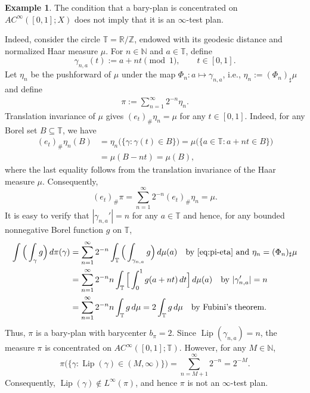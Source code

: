 \documentclass[11pt]{amsart}
\theoremstyle{definition}
\newtheorem{example}[theorem]{Example}
\theoremstyle{remark}
\numberwithin{equation}{section}
\begin{document}
\begin{example}\label{ex-plans}
The condition that a bary-plan is concentrated on
$AC^{\infty}([0,1];X)$ does not imply that it is an
$\infty$-test plan.

Indeed, consider the circle $\mathbb T=\mathbb R/\mathbb Z$, endowed
with its geodesic distance and normalized Haar measure $\mu$. For
$n\in\mathbb N$ and $a\in\mathbb T$, define
$$
    \gamma_{n,a}(t):=a+nt\pmod 1,
    \qquad t\in[0,1].
$$
Let $\eta_n$ be the pushforward of $\mu$ under the map
$\Phi_n:a\mapsto\gamma_{n,a}$, i.e., $\eta_n:= (\Phi_n)_\sharp\mu
$ and define
\begin{align}\label{eq:pi-eta}
\pi:=\sum_{n=1}^{\infty}2^{-n}\eta_n.
\end{align}
Translation invariance of $\mu$ gives
$(e_t)_\#\eta_n=\mu$ for any $t\in[0,1]$.
Indeed, for any Borel set $B\subseteq\mathbb T$, we have
\begin{align*}
(e_t)_\#\eta_n(B)
&=\eta_n\bigl(\{\gamma:\gamma(t)\in B\}\bigr)=\mu\bigl(\{a\in\mathbb T:a+nt\in B\}\bigr) \\
&=\mu(B-nt)=\mu(B),
\end{align*}
where the last equality follows from the translation invariance of the
Haar measure $\mu$. Consequently,
$$
(e_t)_\#\pi=\sum_{n=1}^{\infty}2^{-n}(e_t)_\#\eta_n =\mu.
$$
It is easy to verify that $|\gamma_{n,a}'|=n$ for any $a\in\mathbb T$
and hence, for any bounded nonnegative Borel function $g$ on $\mathbb T$,
\begin{align*}
\int\Big(\int_\gamma g\Big)\,d\pi(\gamma)
&=\sum_{n=1}^{\infty}2^{-n}\int_{\mathbb T}
\Big(\int_{\gamma_{n,a}}g \Big)\,d\mu(a)\quad\text{by \eqref{eq:pi-eta} and
$\eta_n=(\Phi_n)_\sharp\mu$}\\
&=\sum_{n=1}^{\infty}2^{-n}n\int_{\mathbb T}
\Big[\int_{0}^1 g(a+nt)\,dt \Big]\,d\mu(a)\quad \text{by $|\gamma_{n,a}'|=n$}\\
&=\sum_{n=1}^{\infty}2^{-n}n\int_{\mathbb T}g\,d\mu
    =2\int_{\mathbb T}g\,d\mu\quad\text{by Fubini's theorem.}
\end{align*}
Thus, $\pi$ is a bary-plan with barycenter $b_\pi=2$. Since
$\operatorname{Lip}(\gamma_{n,a})=n$, the measure $\pi$ is concentrated
on $AC^{\infty}([0,1];\mathbb T)$. However, for any
$M\in\mathbb N$,
$$
    \pi\bigl(\{\gamma:
    \operatorname{Lip}(\gamma)\in(M,\infty)\}\bigr)
    =\sum_{n=M+1}^{\infty}2^{-n}
    =2^{-M}.
$$
Consequently,
$\operatorname{Lip}(\gamma)\notin L^\infty(\pi)$, and hence $\pi$ is
not an $\infty$-test plan.
\end{example}
\end{document}
